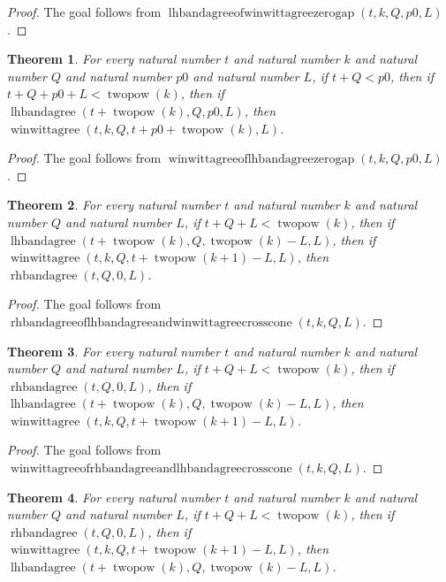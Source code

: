 \documentclass[11pt]{article}
\newtheorem{theorem}{Theorem}[section]
\theoremstyle{definition}
\begin{document}
\begin{proof}
The goal follows from \(\operatorname{lhbandagreeofwinwittagreezerogap}(t, k, Q, p0, L)\).
\end{proof}
\begin{theorem}
\label{ll:paper:winwittagree-of-lhbandagree-zero-gap}
For every natural number \(t\) and natural number \(k\) and natural number \(Q\) and natural number \(p0\) and natural number \(L\), if \(t + Q < p0\), then if \(t + Q + p0 + L < \operatorname{twopow}(k)\), then if \(\operatorname{lhbandagree}(t + \operatorname{twopow}(k), Q, p0, L)\), then \(\operatorname{winwittagree}(t, k, Q, t + p0 + \operatorname{twopow}(k), L)\).
\end{theorem}
\begin{proof}
The goal follows from \(\operatorname{winwittagreeoflhbandagreezerogap}(t, k, Q, p0, L)\).
\end{proof}
\begin{theorem}
\label{ll:paper:rhbandagree-of-lhbandagree-and-winwittagree-cross-cone}
For every natural number \(t\) and natural number \(k\) and natural number \(Q\) and natural number \(L\), if \(t + Q + L < \operatorname{twopow}(k)\), then if \(\operatorname{lhbandagree}(t + \operatorname{twopow}(k), Q, \operatorname{twopow}(k) - L, L)\), then if \(\operatorname{winwittagree}(t, k, Q, t + \operatorname{twopow}(k + 1) - L, L)\), then \(\operatorname{rhbandagree}(t, Q, 0, L)\).
\end{theorem}
\begin{proof}
The goal follows from \(\operatorname{rhbandagreeoflhbandagreeandwinwittagreecrosscone}(t, k, Q, L)\).
\end{proof}
\begin{theorem}
\label{ll:paper:winwittagree-of-rhbandagree-and-lhbandagree-cross-cone}
For every natural number \(t\) and natural number \(k\) and natural number \(Q\) and natural number \(L\), if \(t + Q + L < \operatorname{twopow}(k)\), then if \(\operatorname{rhbandagree}(t, Q, 0, L)\), then if \(\operatorname{lhbandagree}(t + \operatorname{twopow}(k), Q, \operatorname{twopow}(k) - L, L)\), then \(\operatorname{winwittagree}(t, k, Q, t + \operatorname{twopow}(k + 1) - L, L)\).
\end{theorem}
\begin{proof}
The goal follows from \(\operatorname{winwittagreeofrhbandagreeandlhbandagreecrosscone}(t, k, Q, L)\).
\end{proof}
\begin{theorem}
\label{ll:paper:lhbandagree-of-rhbandagree-and-winwittagree-cross-cone}
For every natural number \(t\) and natural number \(k\) and natural number \(Q\) and natural number \(L\), if \(t + Q + L < \operatorname{twopow}(k)\), then if \(\operatorname{rhbandagree}(t, Q, 0, L)\), then if \(\operatorname{winwittagree}(t, k, Q, t + \operatorname{twopow}(k + 1) - L, L)\), then \(\operatorname{lhbandagree}(t + \operatorname{twopow}(k), Q, \operatorname{twopow}(k) - L, L)\).
\end{theorem}
\end{document}
